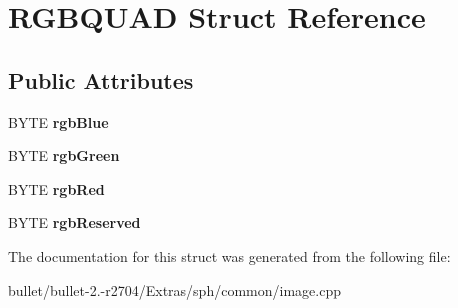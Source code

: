 \hypertarget{struct_r_g_b_q_u_a_d}{\section{R\+G\+B\+Q\+U\+A\+D Struct Reference}
\label{struct_r_g_b_q_u_a_d}
}
\subsection*{Public Attributes}
\begin{DoxyCompactItemize}
\item 
\hypertarget{struct_r_g_b_q_u_a_d_a8de8ebfeae241eba90ca488d65f1e9d1}{B\+Y\+T\+E {\bfseries rgb\+Blue}}\label{struct_r_g_b_q_u_a_d_a8de8ebfeae241eba90ca488d65f1e9d1}

\item 
\hypertarget{struct_r_g_b_q_u_a_d_a865a89fcf92d07b8bf6c9ebdbbcf0525}{B\+Y\+T\+E {\bfseries rgb\+Green}}\label{struct_r_g_b_q_u_a_d_a865a89fcf92d07b8bf6c9ebdbbcf0525}

\item 
\hypertarget{struct_r_g_b_q_u_a_d_aa5b587a190ecbcbc738fd300537084fd}{B\+Y\+T\+E {\bfseries rgb\+Red}}\label{struct_r_g_b_q_u_a_d_aa5b587a190ecbcbc738fd300537084fd}

\item 
\hypertarget{struct_r_g_b_q_u_a_d_a56e850c6d5112ce9e59406097b8b969e}{B\+Y\+T\+E {\bfseries rgb\+Reserved}}\label{struct_r_g_b_q_u_a_d_a56e850c6d5112ce9e59406097b8b969e}

\end{DoxyCompactItemize}


The documentation for this struct was generated from the following file\+:\begin{DoxyCompactItemize}
\item 
bullet/bullet-\/2.-\/r2704/\+Extras/sph/common/image.\+cpp\end{DoxyCompactItemize}
